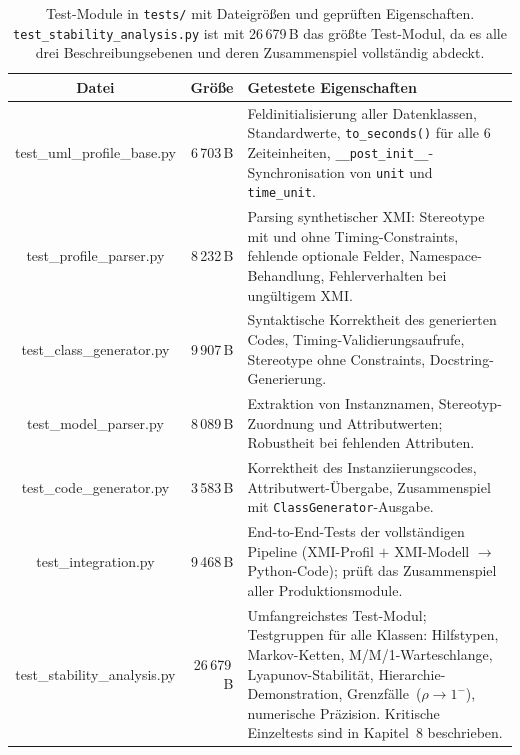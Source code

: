 ﻿\documentclass[a4paper,12pt]{scrreprt}
\theoremstyle{definition}
\begin{document}
\begin{table}[H]
	\small
	\centering
	\renewcommand{\arraystretch}{1.35}
	\begin{tabular}{@{} C r p{6.4cm} @{}}
		\toprule
		\normalfont\textbf{Datei} &
		\textbf{Größe} &
		\textbf{Getestete Eigenschaften} \\
		\midrule
		test\_uml\_profile\_base.py  & 6\,703\,B &
		Feldinitialisierung aller Datenklassen, Standardwerte,
		\texttt{to\_seconds()} für alle 6 Zeiteinheiten,
		\texttt{\_\_post\_init\_\_}-Synchronisation von
		\texttt{unit} und \texttt{time\_unit}. \\
		
		test\_profile\_parser.py     & 8\,232\,B &
		Parsing synthetischer XMI: Stereotype mit und ohne
		Timing-Constraints, fehlende optionale Felder,
		Namespace-Behandlung, Fehlerverhalten bei ungültigem XMI. \\
		
		test\_class\_generator.py    & 9\,907\,B &
		Syntaktische Korrektheit des generierten Codes,
		Timing-Validierungsaufrufe, Stereotype ohne Constraints,
		Docstring-Generierung. \\
		
		test\_model\_parser.py       & 8\,089\,B &
		Extraktion von Instanznamen, Stereotyp-Zuordnung und
		Attributwerten; Robustheit bei fehlenden Attributen. \\
		
		test\_code\_generator.py     & 3\,583\,B &
		Korrektheit des Instanziierungscodes,
		Attributwert-Übergabe, Zusammenspiel mit
		\texttt{ClassGenerator}-Ausgabe. \\
		
		test\_integration.py         & 9\,468\,B &
		End-to-End-Tests der vollständigen Pipeline
		(XMI-Profil $+$ XMI-Modell $\to$ Python-Code);
		prüft das Zusammenspiel aller Produktionsmodule. \\
		
		test\_stability\_analysis.py & 26\,679\,B &
		Umfangreichstes Test-Modul; Testgruppen für alle Klassen:
		Hilfstypen, Markov-Ketten, M/M/1-Warteschlange,
		Lyapunov-Stabilität, Hierarchie-Demonstration,
		Grenzfälle~($\rho \to 1^{-}$), numerische Präzision.
		Kritische Einzeltests sind in Kapitel~8 beschrieben. \\
		\bottomrule
	\end{tabular}
	\caption{Test-Module in \texttt{tests/} mit Dateigrößen und
		geprüften Eigenschaften.
		\texttt{test\_stability\_analysis.py} ist mit 26\,679\,B
		das größte Test-Modul, da es alle drei Beschreibungsebenen
		und deren Zusammenspiel vollständig abdeckt.}
	\label{tab:module-tests}
\end{table}
\end{document}
